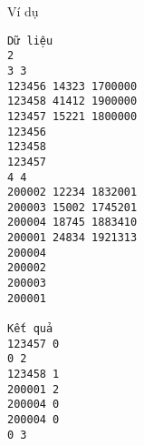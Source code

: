 Ví dụ
\begin{verbatim}
Dữ liệu
2
3 3
123456 14323 1700000
123458 41412 1900000
123457 15221 1800000
123456
123458
123457
4 4
200002 12234 1832001
200003 15002 1745201
200004 18745 1883410
200001 24834 1921313
200004
200002
200003
200001

Kết quả
123457 0
0 2
123458 1
200001 2
200004 0
200004 0
0 3
\end{verbatim}